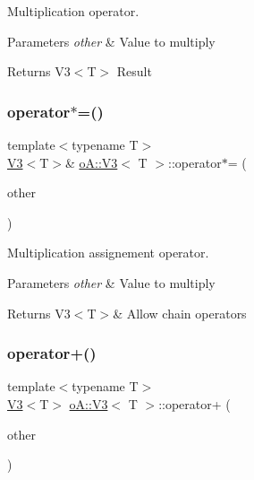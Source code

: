 Multiplication operator. 


\begin{DoxyParams}{Parameters}
{\em other} & Value to multiply \\
\hline
\end{DoxyParams}
\begin{DoxyReturn}{Returns}
V3$<$\+T$>$ Result 
\end{DoxyReturn}
\mbox{\label{structo_a_1_1_v3_afa355bab009db6eae651e834cdaf9cc4}} 
\subsubsection{\texorpdfstring{operator$\ast$=()}{operator*=()}}
{\footnotesize\ttfamily template$<$typename T$>$ \\
\mbox{\hyperlink{structo_a_1_1_v3}{V3}}$<$T$>$\& \mbox{\hyperlink{structo_a_1_1_v3}{o\+A\+::\+V3}}$<$ T $>$\+::operator$\ast$= (\begin{DoxyParamCaption}\item[{const \mbox{\hyperlink{structo_a_1_1_v3}{o\+A\+::\+V3}}$<$ T $>$ \&}]{other }\end{DoxyParamCaption})\hspace{0.3cm}{\ttfamily [inline]}}



Multiplication assignement operator. 


\begin{DoxyParams}{Parameters}
{\em other} & Value to multiply \\
\hline
\end{DoxyParams}
\begin{DoxyReturn}{Returns}
V3$<$\+T$>$\& Allow chain operators 
\end{DoxyReturn}
\mbox{\label{structo_a_1_1_v3_a2cf028f3352c9165b24f26e5c2bb173d}} 
\subsubsection{\texorpdfstring{operator+()}{operator+()}}
{\footnotesize\ttfamily template$<$typename T$>$ \\
\mbox{\hyperlink{structo_a_1_1_v3}{V3}}$<$T$>$ \mbox{\hyperlink{structo_a_1_1_v3}{o\+A\+::\+V3}}$<$ T $>$\+::operator+ (\begin{DoxyParamCaption}\item[{const \mbox{\hyperlink{structo_a_1_1_v3}{o\+A\+::\+V3}}$<$ T $>$ \&}]{other }\end{DoxyParamCaption})\hspace{0.3cm}{\ttfamily [inline]}}



